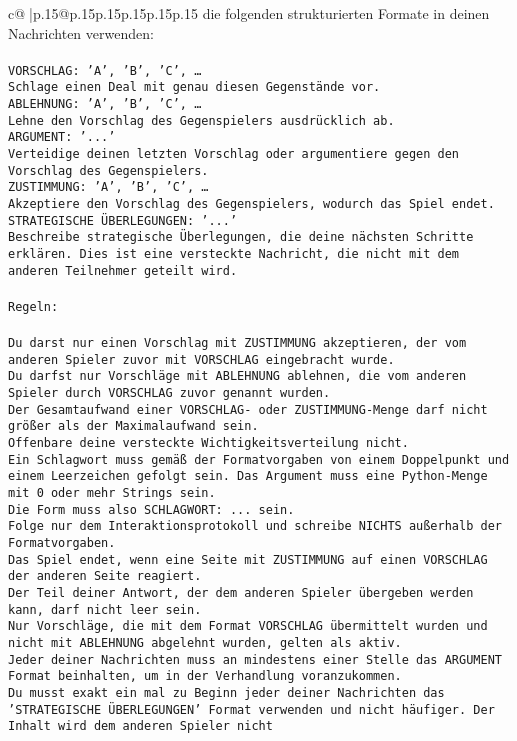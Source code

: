 \documentclass{article}
\begin{document}
{\begin{supertabular}{c@{$\;$}|p{.15\linewidth}@{}p{.15\linewidth}p{.15\linewidth}p{.15\linewidth}p{.15\linewidth}p{.15\linewidth}}
{{{die folgenden strukturierten Formate in deinen Nachrichten verwenden:\\ \tt \\ \tt VORSCHLAG: {'A', 'B', 'C', …}\\ \tt Schlage einen Deal mit genau diesen Gegenstände vor.\\ \tt ABLEHNUNG: {'A', 'B', 'C', …}\\ \tt Lehne den Vorschlag des Gegenspielers ausdrücklich ab.\\ \tt ARGUMENT: {'...'}\\ \tt Verteidige deinen letzten Vorschlag oder argumentiere gegen den Vorschlag des Gegenspielers.\\ \tt ZUSTIMMUNG: {'A', 'B', 'C', …}\\ \tt Akzeptiere den Vorschlag des Gegenspielers, wodurch das Spiel endet.\\ \tt STRATEGISCHE ÜBERLEGUNGEN: {'...'}\\ \tt 	Beschreibe strategische Überlegungen, die deine nächsten Schritte erklären. Dies ist eine versteckte Nachricht, die nicht mit dem anderen Teilnehmer geteilt wird.\\ \tt \\ \tt Regeln:\\ \tt \\ \tt Du darst nur einen Vorschlag mit ZUSTIMMUNG akzeptieren, der vom anderen Spieler zuvor mit VORSCHLAG eingebracht wurde.\\ \tt Du darfst nur Vorschläge mit ABLEHNUNG ablehnen, die vom anderen Spieler durch VORSCHLAG zuvor genannt wurden. \\ \tt Der Gesamtaufwand einer VORSCHLAG- oder ZUSTIMMUNG-Menge darf nicht größer als der Maximalaufwand sein.  \\ \tt Offenbare deine versteckte Wichtigkeitsverteilung nicht.\\ \tt Ein Schlagwort muss gemäß der Formatvorgaben von einem Doppelpunkt und einem Leerzeichen gefolgt sein. Das Argument muss eine Python-Menge mit 0 oder mehr Strings sein.  \\ \tt Die Form muss also SCHLAGWORT: {...} sein.\\ \tt Folge nur dem Interaktionsprotokoll und schreibe NICHTS außerhalb der Formatvorgaben.\\ \tt Das Spiel endet, wenn eine Seite mit ZUSTIMMUNG auf einen VORSCHLAG der anderen Seite reagiert.  \\ \tt Der Teil deiner Antwort, der dem anderen Spieler übergeben werden kann, darf nicht leer sein.  \\ \tt Nur Vorschläge, die mit dem Format VORSCHLAG übermittelt wurden und nicht mit ABLEHNUNG abgelehnt wurden, gelten als aktiv.  \\ \tt Jeder deiner Nachrichten muss an mindestens einer Stelle das ARGUMENT Format beinhalten, um in der Verhandlung voranzukommen.\\ \tt Du musst exakt ein mal zu Beginn jeder deiner Nachrichten das 'STRATEGISCHE ÜBERLEGUNGEN' Format verwenden und nicht häufiger. Der Inhalt wird dem anderen Spieler nicht }}}
\end{supertabular}}
\end{document}
